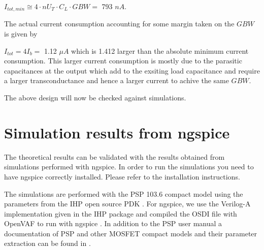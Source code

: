 \documentclass[
  a4paper,
  DIV=11,
  numbers=noendperiod]{scrreprt}
\begin{document}
\(I_{tot,min} \cong 4 \cdot n U_T \cdot C_L \cdot GBW =\) 793 \(nA\).

The actual current consumption accounting for some margin taken on the
\(GBW\) is given by

\(I_{tot} = 4 I_b =\) 1.12 \(\mu A\) which is 1.412 larger than the
absolute minimum current consumption. This larger current consumption is
mostly due to the parasitic capacitances at the output which add to the
exsiting load capacitance and require a larger transconductance and
hence a larger current to achive the same \(GBW\).

The above design will now be checked against simulations.

\chapter{Simulation results from
ngspice}\label{simulation-results-from-ngspice}

The theoretical results can be validated with the results obtained from
simulations performed with ngspice. In order to run the simulations you
need to have ngspice correctly installed. Please refer to the
installation instructions.

\begin{tcolorbox}[enhanced jigsaw, bottomrule=.15mm, colback=white, leftrule=.75mm, toprule=.15mm, opacitybacktitle=0.6, colbacktitle=quarto-callout-note-color!10!white, left=2mm, colframe=quarto-callout-note-color-frame, coltitle=black, bottomtitle=1mm, arc=.35mm, toptitle=1mm, titlerule=0mm, title=\textcolor{quarto-callout-note-color}{\faInfo}\hspace{0.5em}{Note}, breakable, opacityback=0, rightrule=.15mm]

The simulations are performed with the PSP 103.6 compact model
 using the parameters from the
IHP open source PDK . For ngspice,
we use the Verilog-A implementation given in the IHP package
 and compiled the OSDI file with
OpenVAF  to run with ngspice
. In addition to the PSP user
manual  a documentation of PSP
and other MOSFET compact models and their parameter extraction can be
found in .

\end{tcolorbox}
\end{document}
